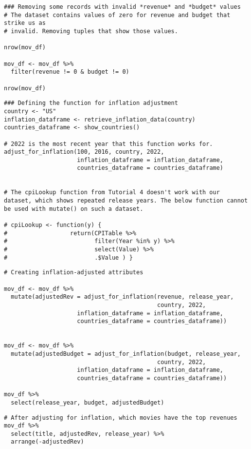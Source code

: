 \begin{lstlisting}
### Removing some records with invalid *revenue* and *budget* values
# The dataset contains values of zero for revenue and budget that strike us as
# invalid. Removing tuples that show those values.

nrow(mov_df)

mov_df <- mov_df %>%
  filter(revenue != 0 & budget != 0)

nrow(mov_df)
\end{lstlisting}

\begin{lstlisting}
### Defining the function for inflation adjustment
country <- "US"
inflation_dataframe <- retrieve_inflation_data(country)
countries_dataframe <- show_countries()

# 2022 is the most recent year that this function works for.
adjust_for_inflation(100, 2016, country, 2022,
                     inflation_dataframe = inflation_dataframe,
                     countries_dataframe = countries_dataframe)


# The cpiLookup function from Tutorial 4 doesn't work with our dataset, which shows repeated release years. The below function cannot be used with mutate() on such a dataset.

# cpiLookup <- function(y) { 
#                  return(CPITable %>% 
#                         filter(Year %in% y) %>%
#                         select(Value) %>% 
#                         .$Value ) }
\end{lstlisting}

\begin{lstlisting}
# Creating inflation-adjusted attributes

mov_df <- mov_df %>%
  mutate(adjustedRev = adjust_for_inflation(revenue, release_year,
                                            country, 2022,
                     inflation_dataframe = inflation_dataframe,
                     countries_dataframe = countries_dataframe))


mov_df <- mov_df %>%
  mutate(adjustedBudget = adjust_for_inflation(budget, release_year,
                                            country, 2022,
                     inflation_dataframe = inflation_dataframe,
                     countries_dataframe = countries_dataframe))

mov_df %>%
  select(release_year, budget, adjustedBudget)
\end{lstlisting}

\begin{lstlisting}
# After adjusting for inflation, which movies have the top revenues
mov_df %>%
  select(title, adjustedRev, release_year) %>%
  arrange(-adjustedRev)
\end{lstlisting}

